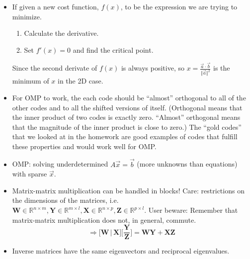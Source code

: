 \documentclass{article}
\begin{document}
\begin{itemize}
\begin{itemize}
	\end{itemize}
	\item If given a new cost function, $f(x)$, to be the expression we are trying to minimize.
	\begin{enumerate}
		\item Calculate the derivative.
		\item Set $f'(x) = 0$ and find the critical point.
	\end{enumerate}
	Since the second derivate of $f(x)$ is always positive, so
	$x = \frac{\vec{a}\cdot\vec{b}}{\Vert\vec{a}\Vert^2}$
	is the minimum of $x$ in the 2D case.
	\item For OMP to work, the each code should be “almost” orthogonal to all of the other codes and to all the shifted versions of itself. (Orthogonal means that the inner product of two codes is exactly zero. “Almost” orthogonal means that the magnitude of the inner product is close to zero.) The “gold codes” that we looked at in the homework are good examples of codes that fulfill these properties and would work well for OMP.
	\item OMP: solving underdetermined $A\vec{x} = \vec{b}$ (more unknowns than equations) with {\color{red} sparse} $\vec{x}$.
	\item Matrix-matrix multiplication can be handled in blocks! Care: restrictions on the dimensions of the matrices,
	i.e. $\mathbf{W} \in \mathbb{R}^{n\times m}, \mathbf{Y} \in \mathbb{R}^{m\times l},
	\mathbf{X} \in \mathbb{R}^{n\times p}, \mathbf{Z} \in \mathbb{R}^{p\times l}$.
	User beware: Remember that matrix-matrix multiplication does not, in general, commute.
	$$\Longrightarrow \big[\mathbf{W}\, |\, \mathbf{X}\big] \bigg[\frac{\mathbf{Y}}{\mathbf{Z}}\bigg] = \mathbf{W}\mathbf{Y} + \mathbf{X}\mathbf{Z}$$
	\item Inverse matrices have the same eigenvectors and reciprocal eigenvalues.
\end{itemize}
\end{document}
